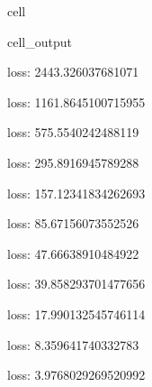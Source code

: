 \documentclass[letterpaper,10pt,english]{jupyterBook}
\begin{document}
\begin{sphinxuseclass}{cell}
\begin{sphinxVerbatimOutput}
\begin{sphinxuseclass}{cell_output}
\begin{sphinxVerbatim}[commandchars=\\\{\}]
loss: 2443.326037681071
\end{sphinxVerbatim}

\begin{sphinxVerbatim}[commandchars=\\\{\}]
loss: 1161.8645100715955
\end{sphinxVerbatim}

\begin{sphinxVerbatim}[commandchars=\\\{\}]
loss: 575.5540242488119
\end{sphinxVerbatim}

\begin{sphinxVerbatim}[commandchars=\\\{\}]
loss: 295.8916945789288
\end{sphinxVerbatim}

\begin{sphinxVerbatim}[commandchars=\\\{\}]
loss: 157.12341834262693
\end{sphinxVerbatim}

\begin{sphinxVerbatim}[commandchars=\\\{\}]
loss: 85.67156073552526
\end{sphinxVerbatim}

\begin{sphinxVerbatim}[commandchars=\\\{\}]
loss: 47.66638910484922
\end{sphinxVerbatim}

\begin{sphinxVerbatim}[commandchars=\\\{\}]
loss: 39.858293701477656
\end{sphinxVerbatim}

\begin{sphinxVerbatim}[commandchars=\\\{\}]
loss: 17.990132545746114
\end{sphinxVerbatim}

\begin{sphinxVerbatim}[commandchars=\\\{\}]
loss: 8.359641740332783
\end{sphinxVerbatim}

\begin{sphinxVerbatim}[commandchars=\\\{\}]
loss: 3.9768029269520992
\end{sphinxVerbatim}


\end{sphinxuseclass}
\end{sphinxVerbatimOutput}
\end{sphinxuseclass}
\end{document}
